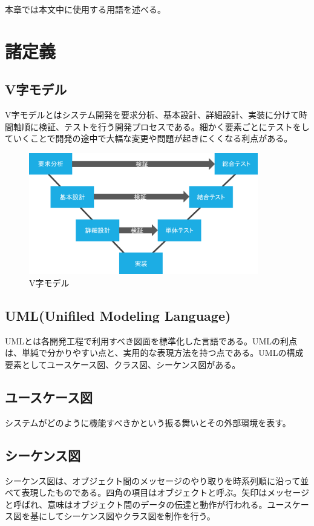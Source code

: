 本章では本文中に使用する用語を述べる。

\section{諸定義}

\subsection*{V字モデル}
V字モデルとはシステム開発を要求分析、基本設計、詳細設計、実装に分けて時間軸順に検証、テストを行う開発プロセスである。細かく要素ごとにテストをしていくことで開発の途中で大幅な変更や問題が起きにくくなる利点がある。

\begin{figure}[htbp]
\centering
\includegraphics[width=10cm]{./pic/vjimodel.eps}
\caption{V字モデル}
\label{v_model}
\end{figure}

\subsection*{UML(Unifiled Modeling Language)}
UMLとは各開発工程で利用すべき図面を標準化した言語である。UMLの利点は、単純で分かりやすい点と、実用的な表現方法を持つ点である。UMLの構成要素としてユースケース図、クラス図、シーケンス図がある\cite{uml}。

\subsection*{ユースケース図}
システムがどのように機能すべきかという振る舞いとその外部環境を表す。


\subsection*{シーケンス図}
シーケンス図は、オブジェクト間のメッセージのやり取りを時系列順に沿って並べて表現したものである。四角の項目はオブジェクトと呼ぶ。矢印はメッセージと呼ばれ、意味はオブジェクト間のデータの伝達と動作が行われる。ユースケース図を基にしてシーケンス図やクラス図を制作を行う。

